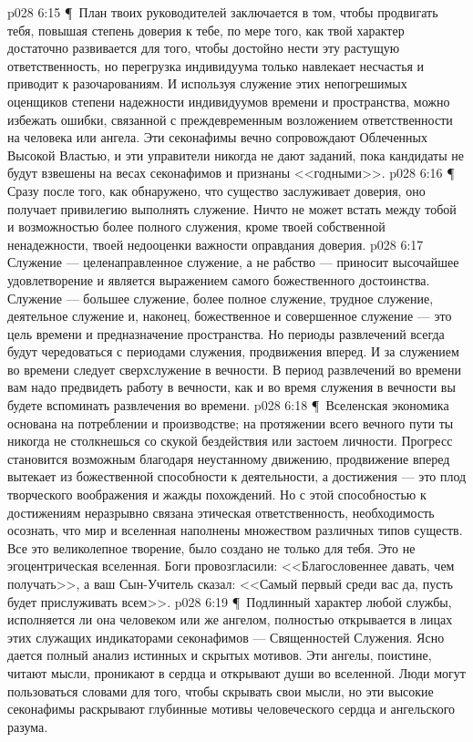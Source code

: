 \vs p028 6:15 \P\ План твоих руководителей заключается в том, чтобы продвигать тебя, повышая степень доверия к тебе, по мере того, как твой характер достаточно развивается для того, чтобы достойно нести эту растущую ответственность, но перегрузка индивидуума только навлекает несчастья и приводит к разочарованиям. И используя служение этих непогрешимых оценщиков степени надежности индивидуумов времени и пространства, можно избежать ошибки, связанной с преждевременным возложением ответственности на человека или ангела. Эти секонафимы вечно сопровождают Облеченных Высокой Властью, и эти управители никогда не дают заданий, пока кандидаты не будут взвешены на весах секонафимов и признаны <<годными>>.
\vs p028 6:16 \P\ \bibnobreakspace {} Сразу после того, как обнаружено, что существо заслуживает доверия, оно получает привилегию выполнять служение. Ничто не может встать между тобой и возможностью более полного служения, кроме твоей собственной ненадежности, твоей недооценки важности оправдания доверия.
\vs p028 6:17 Служение --- целенаправленное служение, а не рабство --- приносит высочайшее удовлетворение и является выражением самого божественного достоинства. Служение --- большее служение, более полное служение, трудное служение, деятельное служение и, наконец, божественное и совершенное служение --- это цель времени и предназначение пространства. Но периоды развлечений всегда будут чередоваться с периодами служения, продвижения вперед. И за служением во времени следует сверхслужение в вечности. В период развлечений во времени вам надо предвидеть работу в вечности, как и во время служения в вечности вы будете вспоминать развлечения во времени.
\vs p028 6:18 \P\ Вселенская экономика основана на потреблении и производстве; на протяжении всего вечного пути ты никогда не столкнешься со скукой бездействия или застоем личности. Прогресс становится возможным благодаря неустанному движению, продвижение вперед вытекает из божественной способности к деятельности, а достижения --- это плод творческого воображения и жажды похождений. Но с этой способностью к достижениям неразрывно связана этическая ответственность, необходимость осознать, что мир и вселенная наполнены множеством различных типов существ. Все это великолепное творение,  было создано не только для тебя. Это не эгоцентрическая вселенная. Боги провозгласили: <<Благословеннее давать, чем получать>>, а ваш Сын\hyp{}Учитель сказал: <<Самый первый среди вас да, пусть будет прислуживать всем>>.
\vs p028 6:19 \P\ Подлинный характер любой службы, исполняется ли она человеком или же ангелом, полностью открывается в лицах этих служащих индикаторами секонафимов --- Священностей Служения. Ясно дается полный анализ истинных и скрытых мотивов. Эти ангелы, поистине, читают мысли, проникают в сердца и открывают души во вселенной. Люди могут пользоваться словами для того, чтобы скрывать свои мысли, но эти высокие секонафимы раскрывают глубинные мотивы человеческого сердца и ангельского разума.
